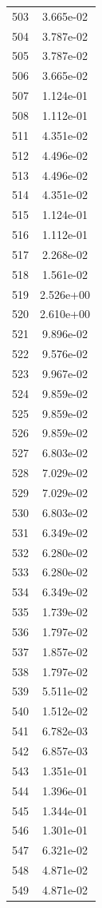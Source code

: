 \documentclass[12pt]{article}
\begin{document}
\begin{longtable}{@{}cc@{}}
503 & 3.665e-02 \\
504 & 3.787e-02 \\
505 & 3.787e-02 \\
506 & 3.665e-02 \\
507 & 1.124e-01 \\
508 & 1.112e-01 \\
511 & 4.351e-02 \\
512 & 4.496e-02 \\
513 & 4.496e-02 \\
514 & 4.351e-02 \\
515 & 1.124e-01 \\
516 & 1.112e-01 \\
517 & 2.268e-02 \\
518 & 1.561e-02 \\
519 & 2.526e+00 \\
520 & 2.610e+00 \\
521 & 9.896e-02 \\
522 & 9.576e-02 \\
523 & 9.967e-02 \\
524 & 9.859e-02 \\
525 & 9.859e-02 \\
526 & 9.859e-02 \\
527 & 6.803e-02 \\
528 & 7.029e-02 \\
529 & 7.029e-02 \\
530 & 6.803e-02 \\
531 & 6.349e-02 \\
532 & 6.280e-02 \\
533 & 6.280e-02 \\
534 & 6.349e-02 \\
535 & 1.739e-02 \\
536 & 1.797e-02 \\
537 & 1.857e-02 \\
538 & 1.797e-02 \\
539 & 5.511e-02 \\
540 & 1.512e-02 \\
541 & 6.782e-03 \\
542 & 6.857e-03 \\
543 & 1.351e-01 \\
544 & 1.396e-01 \\
545 & 1.344e-01 \\
546 & 1.301e-01 \\
547 & 6.321e-02 \\
548 & 4.871e-02 \\
549 & 4.871e-02 \\

\end{longtable}
\end{document}
